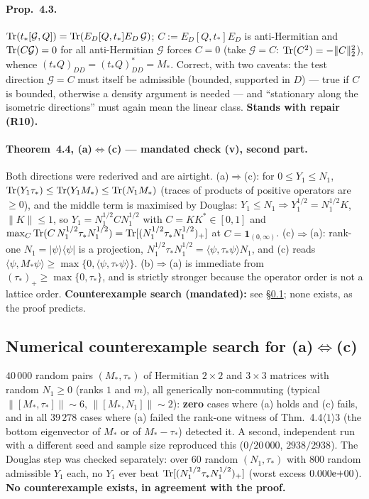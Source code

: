 \documentclass[11pt]{article}
\begin{document}
\paragraph{Prop.~4.3.}  $\operatorname{Tr}(t_*[\mathcal G,Q])=\operatorname{Tr}(E_D[Q,t_*]E_D\,\mathcal G)$;
$C:=E_D[Q,t_*]E_D$ is anti-Hermitian and $\operatorname{Tr}(C\mathcal G)=0$ for all anti-Hermitian
$\mathcal G$ forces $C=0$ (take $\mathcal G=C$: $\operatorname{Tr}(C^2)=-\|C\|_2^2$), whence
$(t_*Q)_{DD}=(t_*Q)_{DD}^*=M_*$.  Correct, with two caveats: the test direction
$\mathcal G=C$ must itself be admissible (bounded, supported in $D$) --- true if $C$ is
bounded, otherwise a density argument is needed --- and ``stationary along the isometric
directions'' must again mean the linear class.  \textbf{Stands with repair (R10).}

\paragraph{Theorem~4.4, (a)$\Leftrightarrow$(c) --- mandated check (v), second part.}
Both directions were rederived and are airtight.  (a)$\Rightarrow$(c): for $0\le Y_1\le N_1$,
$\operatorname{Tr}(Y_1\tau_*)\le\operatorname{Tr}(Y_1M_*)\le\operatorname{Tr}(N_1M_*)$ (traces of products of positive operators are
$\ge0$), and the middle term is maximised by Douglas: $Y_1\le N_1\Rightarrow
Y_1^{1/2}=N_1^{1/2}K$, $\|K\|\le1$, so $Y_1=N_1^{1/2}CN_1^{1/2}$ with $C=KK^*\in[0,1]$ and
$\max_C\operatorname{Tr}(C\,N_1^{1/2}\tau_*N_1^{1/2})=\operatorname{Tr}[(N_1^{1/2}\tau_*N_1^{1/2})_+]$ at
$C=\mathbf1_{(0,\infty)}$.  (c)$\Rightarrow$(a): rank-one $N_1=|\psi\rangle\langle\psi|$ is
a projection, $N_1^{1/2}\tau_*N_1^{1/2}=\langle\psi,\tau_*\psi\rangle N_1$, and (c) reads
$\langle\psi,M_*\psi\rangle\ge\max\{0,\langle\psi,\tau_*\psi\rangle\}$.  (b)$\Rightarrow$(a)
is immediate from $(\tau_*)_+\ge\max\{0,\tau_*\}$, and is strictly stronger because the
operator order is not a lattice order.
\textbf{Counterexample search (mandated):} see \S\ref{sec:numcheck}; none exists, as the
proof predicts.


\subsection{Numerical counterexample search for (a)$\Leftrightarrow$(c)}\label{sec:numcheck}
$40\,000$ random pairs $(M_*,\tau_*)$ of Hermitian $2\times2$ and $3\times3$ matrices with
random $N_1\ge0$ (ranks $1$ and $m$), all generically non-commuting (typical
$\|[M_*,\tau_*]\|\sim6$, $\|[M_*,N_1]\|\sim2$): \textbf{zero} cases where (a) holds and (c)
fails, and in all $39\,278$ cases where (a) failed the rank-one witness of
Thm.~4.4$\langle1\rangle3$ (the bottom eigenvector of $M_*$ or of $M_*-\tau_*$) detected it.
A second, independent run with a different seed and sample size reproduced this
($0/20\,000$, $2938/2938$).  The Douglas step was checked separately: over $60$ random
$(N_1,\tau_*)$ with $800$ random admissible $Y_1$ each, no $Y_1$ ever beat
$\operatorname{Tr}[(N_1^{1/2}\tau_*N_1^{1/2})_+]$ (worst excess $0.000\rm e{+}00$).
\textbf{No counterexample exists, in agreement with the proof.}
\end{document}
